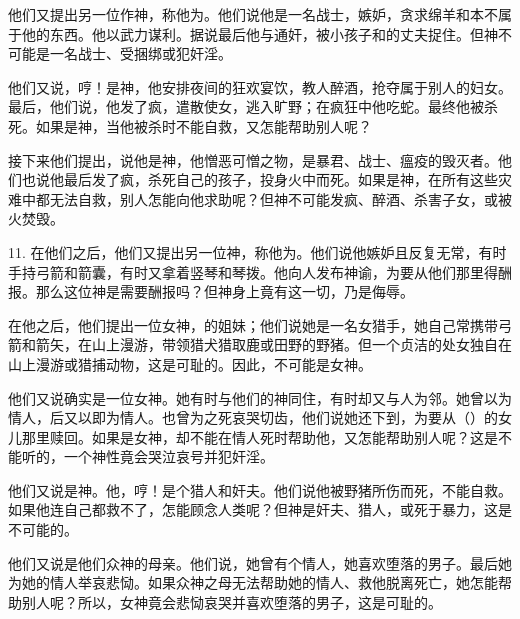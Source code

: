 他们又提出另一位作神，称他为。他们说他是一名战士，嫉妒，贪求绵羊和本不属于他的东西。他以武力谋利。据说最后他与通奸，被小孩子和的丈夫捉住。但神不可能是一名战士、受捆绑或犯奸淫。\par

他们又说，哼！是神，他安排夜间的狂欢宴饮，教人醉酒，抢夺属于别人的妇女。最后，他们说，他发了疯，遣散使女，逃入旷野；在疯狂中他吃蛇。最终他被杀死。如果是神，当他被杀时不能自救，又怎能帮助别人呢？\par

接下来他们提出，说他是神，他憎恶可憎之物，是暴君、战士、瘟疫的毁灭者。他们也说他最后发了疯，杀死自己的孩子，投身火中而死。如果是神，在所有这些灾难中都无法自救，别人怎能向他求助呢？但神不可能发疯、醉酒、杀害子女，或被火焚毁。\par

11. 在他们之后，他们又提出另一位神，称他为。他们说他嫉妒且反复无常，有时手持弓箭和箭囊，有时又拿着竖琴和琴拨。他向人发布神谕，为要从他们那里得酬报。那么这位神是需要酬报吗？但神身上竟有这一切，乃是侮辱。\par

在他之后，他们提出一位女神，的姐妹；他们说她是一名女猎手，她自己常携带弓箭和箭矢，在山上漫游，带领猎犬猎取鹿或田野的野猪。但一个贞洁的处女独自在山上漫游或猎捕动物，这是可耻的。因此，不可能是女神。\par

他们又说确实是一位女神。她有时与他们的神同住，有时却又与人为邻。她曾以为情人，后又以即为情人。也曾为之死哀哭切齿，他们说她还下到，为要从（）的女儿那里赎回。如果是女神，却不能在情人死时帮助他，又怎能帮助别人呢？这是不能听的，一个神性竟会哭泣哀号并犯奸淫。\par

他们又说是神。他，哼！是个猎人和奸夫。他们说他被野猪所伤而死，不能自救。如果他连自己都救不了，怎能顾念人类呢？但神是奸夫、猎人，或死于暴力，这是不可能的。\par

他们又说是他们众神的母亲。他们说，她曾有个情人，她喜欢堕落的男子。最后她为她的情人举哀悲恸。如果众神之母无法帮助她的情人、救他脱离死亡，她怎能帮助别人呢？所以，女神竟会悲恸哀哭并喜欢堕落的男子，这是可耻的。\par

